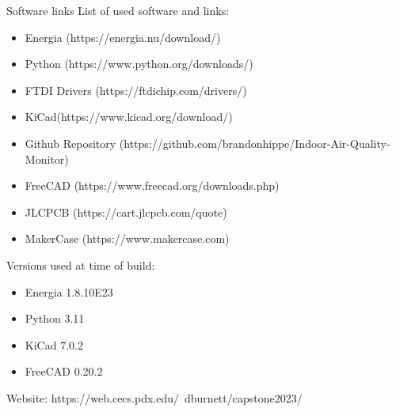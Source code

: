 Software links
List of used software and links:
\begin{itemize}
\item Energia (https://energia.nu/download/)
\item Python (https://www.python.org/downloads/)
\item FTDI Drivers (https://ftdichip.com/drivers/)
\item KiCad(https://www.kicad.org/download/)
\item Github Repository (https://github.com/brandonhippe/Indoor-Air-Quality-Monitor) 
\item FreeCAD (https://www.freecad.org/downloads.php) 
\item JLCPCB (https://cart.jlcpcb.com/quote) 
\item MakerCase (https://www.makercase.com)
\end{itemize}
Versions used at time of build:
\begin{itemize}
\item Energia 1.8.10E23
\item Python 3.11
\item KiCad 7.0.2
\item FreeCAD 0.20.2
\end{itemize}

Website: 
https://web.cecs.pdx.edu/~dburnett/capstone2023/